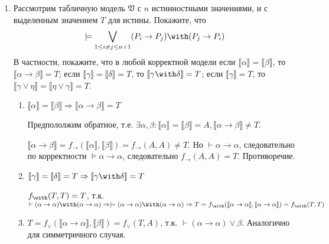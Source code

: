 

\cfoot{}



\begin{enumerate}[wide, labelwidth=!, labelindent=0pt]
      \item Рассмотрим табличную модель $\mathfrak{V}$ с $n$ истинностными значениями,
            и с выделенным значением $T$ для истины.
            Покажите, что $$\models\bigvee_{1 \le i\ne j \le n+1} (P_i \rightarrow P_j)\with(P_j\rightarrow P_i)$$
            В частности, покажите, что в любой корректной модели если $\llbracket\alpha\rrbracket = \llbracket\beta\rrbracket$, то
            $\llbracket\alpha\rightarrow\beta\rrbracket = T$; если $\llbracket\gamma\rrbracket = \llbracket\delta\rrbracket = T$, то
            $\llbracket\gamma\with\delta\rrbracket = T$;
            если $\llbracket\gamma\rrbracket = T$, то $\llbracket\gamma\vee\eta\rrbracket = \llbracket\eta\vee\gamma\rrbracket = T$.

            \begin{enumerate}
                  \item \(\llbracket\alpha\rrbracket = \llbracket\beta\rrbracket \Rightarrow \llbracket\alpha\rightarrow\beta\rrbracket = T\)

                        Предпололжим обратное, т.е. \(\exists \alpha, \beta : \llbracket \alpha \rrbracket = \llbracket \beta \rrbracket = A, \llbracket \alpha \to \beta \rrbracket \neq T\).

                        \(\llbracket \alpha \to \beta \rrbracket = f_\to (\llbracket \alpha \rrbracket, \llbracket \beta \rrbracket) = f_{\to}(A, A) \neq T\). Но \(\vdash \alpha \to \alpha\), следовательно по корректности \(\models \alpha \to \alpha\), следовательно \(f_\to (A, A) = T\). Противоречие.

                  \item \(\llbracket\gamma\rrbracket = \llbracket\delta\rrbracket = T \Rightarrow \llbracket\gamma\with\delta\rrbracket = T\)

                        \(f_{\with}(T, T) = T\), т.к. \(\vdash (\alpha \to \alpha) \with (\alpha \to \alpha) \Rightarrow \models (\alpha \to \alpha) \with (\alpha \to \alpha) \Rightarrow T = f_{\with}(\llbracket \alpha \to \alpha \rrbracket, \llbracket \alpha \to \alpha \rrbracket) = f_\with (T, T)\)

                  \item \(T = f_\lor(\llbracket \alpha \to \alpha \rrbracket, \llbracket \beta \rrbracket) = f_\lor(T, A)\), т.к. \(\vdash (\alpha \to \alpha) \lor \beta\). Аналогично для симметричного случая.
            \end{enumerate}


\end{enumerate}
